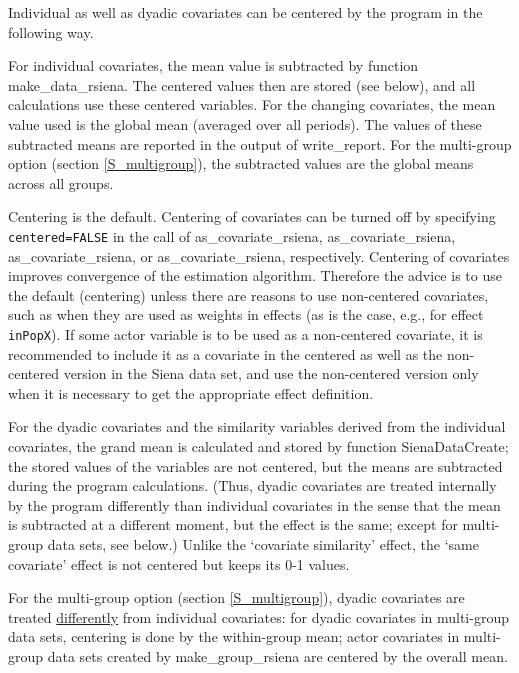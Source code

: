 \documentclass[a4paper,fleqn,11pt]{article}
\newcommand{\+}{\, + \,}
\newcommand{\sfn}[1]{\textsf{#1}}
\begin{document}
Individual as well as dyadic covariates can be centered
by the program in the following way.

For individual covariates, the mean value is subtracted
by function \textsf{make\_data\_rsiena}. The centered values then are stored
(see below),
and all calculations use these centered variables.
For the changing covariates, the mean
value used is the global mean (averaged over all periods).
The values of these subtracted means are reported in the output
of \sfn{write\_report}.
For the multi-group option (section \ref{S_multigroup}),
the subtracted values are the global means across all groups.

Centering is the default.
Centering of covariates can be turned off by specifying
\texttt{centered=FALSE} in the call of \sfn{as\_covariate\_rsiena},
\sfn{as\_covariate\_rsiena}, \sfn{as\_covariate\_rsiena}, or \sfn{as\_covariate\_rsiena}, respectively.
Centering of covariates improves
convergence of the estimation algorithm.
Therefore the advice is to use the default (centering) unless there are reasons to
use non-centered covariates, such as when they are used as weights in effects
(as is the case, e.g., for effect \texttt{inPopX}).
If some actor variable is to be used as a non-centered covariate,
it is recommended to include it as a covariate in the centered
as well as the non-centered version in the Siena data set,
and use the non-centered version only when it is necessary
to get the appropriate effect definition.

For the dyadic covariates and the similarity variables derived
from the individual covariates, the grand mean is calculated
and stored by function \sfn{SienaDataCreate};
the stored values of the variables are not centered, but the means
are subtracted during the program calculations. (Thus,
dyadic covariates are treated internally by the program differently than
individual covariates in the sense that the mean is subtracted at
a different moment, but the effect is the same; except for multi-group
data sets, see below.)
Unlike the `covariate similarity' effect,
the `same covariate' effect is not centered but keeps its 0-1 values.

For the multi-group option (section \ref{S_multigroup}),
dyadic covariates are treated \underline{differently} from
individual covariates:
for dyadic covariates in multi-group data sets, centering is done by the
within-group mean;
actor covariates in multi-group data sets  created by \sfn{make\_group\_rsiena}
are centered by the overall mean.
\end{document}
